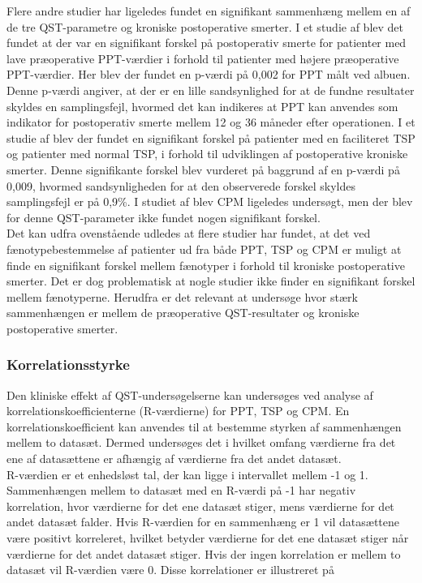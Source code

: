 Flere andre studier har ligeledes fundet en signifikant sammenhæng mellem en af de tre QST-parametre og kroniske postoperative smerter. \citep{Wylde2013} \citep{Wright2015} I et studie af  blev det fundet at der var en signifikant forskel på postoperativ smerte for patienter med lave præoperative PPT-værdier i forhold til patienter med højere præoperative PPT-værdier. Her blev der fundet en p-værdi på 0,002 for PPT målt ved albuen. Denne p-værdi angiver, at der er en lille sandsynlighed for at de fundne resultater skyldes en samplingsfejl, hvormed det kan indikeres at PPT kan anvendes som indikator for postoperativ smerte mellem 12 og 36 måneder efter operationen. \citep{Wright2015} I et studie af  blev der fundet en signifikant forskel på patienter med en faciliteret TSP og patienter med normal TSP, i forhold til udviklingen af postoperative kroniske smerter. Denne signifikante forskel blev vurderet på baggrund af en p-værdi på 0,009, hvormed sandsynligheden for at den observerede forskel skyldes samplingsfejl er på 0,9\%. I studiet af  blev CPM ligeledes undersøgt, men der blev for denne QST-parameter ikke fundet nogen signifikant forskel. \\
Det kan udfra ovenstående udledes at flere studier har fundet, at det ved fænotypebestemmelse af patienter ud fra både PPT, TSP og CPM er muligt at finde en signifikant forskel mellem fænotyper i forhold til kroniske postoperative smerter. Det er dog problematisk at nogle studier ikke finder en signifikant forskel mellem fænotyperne. \citep{Leary2016} Herudfra er det relevant at undersøge hvor stærk sammenhængen er mellem de præoperative QST-resultater og kroniske postoperative smerter.

\subsubsection{Korrelationsstyrke}
Den kliniske effekt af QST-undersøgelserne kan undersøges ved analyse af korrelationskoefficienterne (R-værdierne) for PPT, TSP og CPM. En korrelationskoefficient kan anvendes til at bestemme styrken af sammenhængen mellem to datasæt. Dermed undersøges det i hvilket omfang værdierne fra det ene af datasættene er afhængig af værdierne fra det andet datasæt. \citep{Zar2010} \\
R-værdien er et enhedsløst tal, der kan ligge i intervallet mellem -1 og 1. Sammenhængen mellem to datasæt med en R-værdi på -1 har negativ korrelation, hvor værdierne for det ene datasæt stiger, mens værdierne for det andet datasæt falder. Hvis R-værdien for en sammenhæng er 1 vil datasættene være positivt korreleret, hvilket betyder værdierne for det ene datasæt stiger når værdierne for det andet datasæt stiger. Hvis der ingen korrelation er mellem to datasæt vil R-værdien være 0. \citep{Zar2010} Disse korrelationer er illustreret på 

